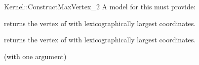 \begin{ccRefFunctionObjectConcept}{Kernel::ConstructMaxVertex_2}
A model for this must provide:


 {returns the vertex of
   with lexicographically largest coordinates.}

 {returns the vertex of
   with lexicographically largest coordinates.}

\ccRefines
{} (with one argument)

\ccSeeAlso
{}\\

\end{ccRefFunctionObjectConcept}
